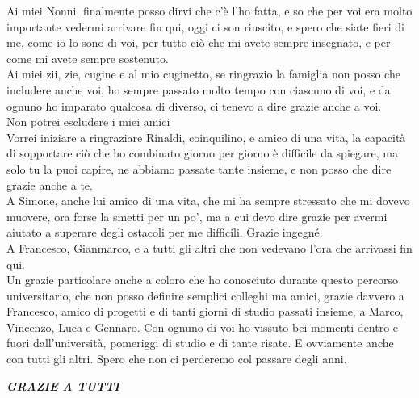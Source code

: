 \documentclass[tesi]{subfiles}
\begin{document}
Ai miei Nonni, finalmente posso dirvi che c’è l’ho fatta, e so che per voi era molto importante vedermi arrivare fin qui, oggi ci son riuscito, e spero che siate fieri di me, come io lo sono di voi, per tutto ciò che mi avete sempre insegnato, e per come mi avete sempre sostenuto.\\


Ai miei zii, zie, cugine e al mio cuginetto, se ringrazio la famiglia non posso che includere anche voi, ho sempre passato molto tempo con ciascuno di voi, e da ognuno ho imparato qualcosa di diverso, ci tenevo a dire grazie anche a voi. \\


Non potrei escludere i miei amici\\


Vorrei iniziare a ringraziare Rinaldi, coinquilino, e amico di una vita, la capacità di sopportare ciò che ho combinato giorno per giorno è difficile da spiegare, ma solo tu la puoi capire, ne abbiamo passate tante insieme, e non posso che dire grazie anche a te.\\


A Simone, anche lui amico di una vita, che mi ha sempre stressato che mi dovevo muovere, ora forse la smetti per un po’, ma a cui devo dire grazie per avermi aiutato a superare degli ostacoli per me difficili. Grazie ingegné.\\


A Francesco, Gianmarco, e a tutti gli altri che non vedevano l’ora che arrivassi fin qui.\\


Un grazie particolare anche a coloro che ho conosciuto durante questo percorso universitario, che non posso definire semplici colleghi ma amici, grazie davvero a Francesco, amico di progetti e di tanti giorni di studio passati insieme, a Marco, Vincenzo, Luca e Gennaro. Con ognuno di voi ho vissuto bei momenti dentro e fuori dall’università, pomeriggi di studio e di tante risate. E ovviamente anche con tutti gli altri. Spero che non ci perderemo col passare degli anni.\\

\begin{center}
\begin{large}
\textbf{
\textit{GRAZIE A TUTTI}}
\end{large}
\end{center}
\end{document}
